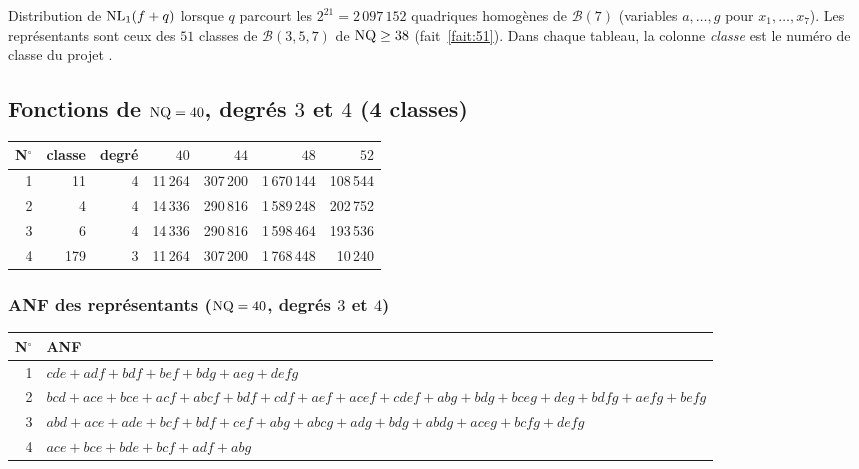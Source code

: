 \noindent Distribution de $\NL(1,f+q)$ lorsque $q$ parcourt les $2^{21}=2\,097\,152$ quadriques homogènes de $\mathcal B(7)$ (variables $a,\dots,g$ pour $x_1,\dots,x_7$). Les représentants sont ceux des $51$ classes de $\mathcal B(3,5,7)$ de $\mathrm{NQ}\ge 38$ (fait~\ref{fait:51}). Dans chaque tableau, la colonne \emph{classe} est le numéro de classe du projet \cite{GL26}.


\subsection{Fonctions de $\mathrm{NQ}=40$, degrés $3$ et $4$ (4 classes)}\label{tab:annexe40}
\begin{center}\footnotesize\setlength{\tabcolsep}{4pt}
\begin{longtable}{r r r r r r r }
\toprule
N$^\circ$ & classe & degré & $40$ & $44$ & $48$ & $52$\\
\midrule
\endhead
1 & 11 & 4 & 11\,264 & 307\,200 & 1\,670\,144 & 108\,544 \\
2 & 4 & 4 & 14\,336 & 290\,816 & 1\,589\,248 & 202\,752 \\
3 & 6 & 4 & 14\,336 & 290\,816 & 1\,598\,464 & 193\,536 \\
4 & 179 & 3 & 11\,264 & 307\,200 & 1\,768\,448 & 10\,240 \\
\bottomrule
\end{longtable}
\end{center}
\subsubsection*{ANF des représentants ($\mathrm{NQ}=40$, degrés $3$ et $4$)}
\begin{longtable}{r p{14.3cm}}
\toprule N$^\circ$ & ANF\\ \midrule
\endhead
1 & {\footnotesize $cde+adf+bdf+bef+bdg+aeg+defg$} \\
2 & {\footnotesize $bcd+ace+bce+acf+abcf+bdf+cdf+aef+acef+cdef+abg+bdg+bceg+deg+bdfg+aefg+befg$} \\
3 & {\footnotesize $abd+ace+ade+bcf+bdf+cef+abg+abcg+adg+bdg+abdg+aceg+bcfg+defg$} \\
4 & {\footnotesize $ace+bce+bde+bcf+adf+abg$} \\
\bottomrule
\end{longtable}
\newpage
